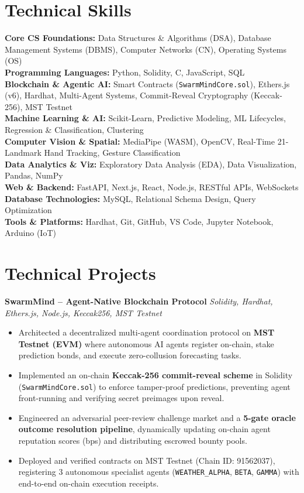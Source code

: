 \documentclass[a4paper,10pt]{article}
\begin{document}
\section{Technical Skills}
\small
\textbf{Core CS Foundations:} Data Structures \& Algorithms (DSA), Database Management Systems (DBMS), Computer Networks (CN), Operating Systems (OS)\\
\textbf{Programming Languages:} Python, Solidity, C, JavaScript, SQL\\
\textbf{Blockchain \& Agentic AI:} Smart Contracts (\texttt{SwarmMindCore.sol}), Ethers.js (v6), Hardhat, Multi-Agent Systems, Commit-Reveal Cryptography (Keccak-256), MST Testnet\\
\textbf{Machine Learning \& AI:} Scikit-Learn, Predictive Modeling, ML Lifecycles, Regression \& Classification, Clustering\\
\textbf{Computer Vision \& Spatial:} MediaPipe (WASM), OpenCV, Real-Time 21-Landmark Hand Tracking, Gesture Classification\\
\textbf{Data Analytics \& Viz:} Exploratory Data Analysis (EDA), Data Visualization, Pandas, NumPy\\
\textbf{Web \& Backend:} FastAPI, Next.js, React, Node.js, RESTful APIs, WebSockets\\
\textbf{Database Technologies:} MySQL, Relational Schema Design, Query Optimization\\
\textbf{Tools \& Platforms:} Hardhat, Git, GitHub, VS Code, Jupyter Notebook, Arduino (IoT)

\section{Technical Projects}

\textbf{SwarmMind -- Agent-Native Blockchain Protocol} \hfill \textit{Solidity, Hardhat, Ethers.js, Node.js, Keccak256, MST Testnet}
\begin{itemize}
    \item Architected a decentralized multi-agent coordination protocol on \textbf{MST Testnet (EVM)} where autonomous AI agents register on-chain, stake prediction bonds, and execute zero-collusion forecasting tasks.
    \item Implemented an on-chain \textbf{Keccak-256 commit-reveal scheme} in Solidity (\texttt{SwarmMindCore.sol}) to enforce tamper-proof predictions, preventing agent front-running and verifying secret preimages upon reveal.
    \item Engineered an adversarial peer-review challenge market and a \textbf{5-gate oracle outcome resolution pipeline}, dynamically updating on-chain agent reputation scores (bps) and distributing escrowed bounty pools.
    \item Deployed and verified contracts on MST Testnet (Chain ID: 91562037), registering 3 autonomous specialist agents (\texttt{WEATHER\_ALPHA}, \texttt{BETA}, \texttt{GAMMA}) with end-to-end on-chain execution receipts.
\end{itemize}
\end{document}
